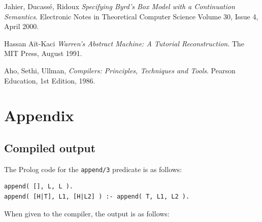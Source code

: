 \documentclass[12pt]{article}
\begin{document}
\begin{thebibliography}{9}

  Jahier, Ducass\'e, Ridoux
  \emph{Specifying Byrd's Box Model with a Continuation Semantics}.
  Electronic Notes in Theoretical Computer Science
  Volume 30, Issue 4,
  April 2000.

  Hassan A\"it-Kaci
  \emph{Warren's Abstract Machine: A Tutorial Reconstruction}.
  The MIT Press,
  August 1991.
  
  Aho, Sethi, Ullman,
  \emph{Compilers: Principles, Techniques and Tools}.
  Pearson Education,
  1st Edition,
  1986.

\end{thebibliography}

\newpage

\section*{Appendix}

\subsection*{Compiled output}

The Prolog code for the \verb|append/3| predicate is as follows:

\begin{verbatim}
append( [], L, L ).
append( [H|T], L1, [H|L2] ) :- append( T, L1, L2 ).
\end{verbatim}

When given to the compiler, the output is as follows:
\end{document}
